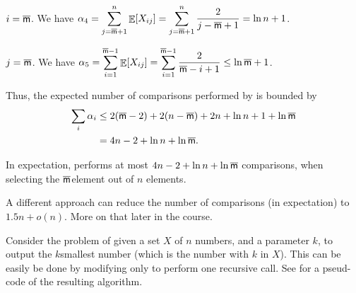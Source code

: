 \begin{compactenumi}
    \item $i=\overline{\mathsf{m}}$.  We have $\displaystyle \alpha_4 =
    \sum_{j=\overline{\mathsf{m}}+1}^n\mathop{\mathbb{E}}\!\left[ {X_{ij}} \right] =
    \sum_{j=\overline{\mathsf{m}}+1}^n\frac{2}{j-\overline{\mathsf{m}}+1} = \ln n + 1$.
    
    \item $j=\overline{\mathsf{m}}$.  We have $\displaystyle \alpha_5 =
    \sum_{i=1}^{\overline{\mathsf{m}}-1}\mathop{\mathbb{E}}\!\left[ {X_{ij}} \right] =
    \sum_{i=1}^{\overline{\mathsf{m}}-1}\frac{2}{\overline{\mathsf{m}}-i+1} \leq \ln \overline{\mathsf{m}} +1$.
\end{compactenumi}
Thus, the expected number of comparisons performed by \QuickSelect is
bounded by 
\begin{align*}
    \sum_i \alpha_i
    &\leq 2(\overline{\mathsf{m}}-2) + 2 ( n-\overline{\mathsf{m}})+2n+\ln n + 1 + \ln \overline{\mathsf{m}} \\
    &= 4n -2 + \ln n + \ln \overline{\mathsf{m}}.
\end{align*}

\begin{theorem}
    In expectation, \QuickSelect performs at most
    $4n -2 + \ln n + \ln \overline{\mathsf{m}}$ comparisons, when selecting the
    $\overline{\mathsf{m}}$\th element out of $n$ elements.
\end{theorem}

A different approach can reduce the number of comparisons (in
expectation) to $1.5n + o(n)$. More on that later in the course.







Consider the problem of given a set $X$ of $n$ numbers, and a
parameter $k$, to output the $k$\th smallest number (which is the
number with  $k$ in $X$). This can be easily be done by
modifying \QuickSort{} only to perform one recursive call.  See
 for a pseud-code of the resulting algorithm.

